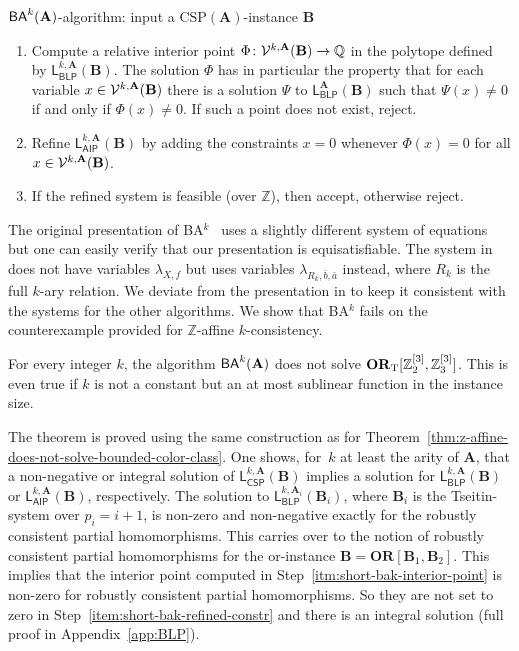 \documentclass[a4paper,english, thm-restate]{lipics-v2021}
\newcommand{\ZZ}{\mathbb{Z}}
\newcommand{\QQ}{\mathbb{Q}}
\newcommand{\tup}[1]{\bar{#1}}
\newcommand{\StructA}{\mathbf{A}}
\newcommand{\StructB}{\mathbf{B}}
\newcommand{\CSP}[1]{\mathrm{CSP}(#1)}
\newcommand{\leqs}{\mathsf{L}}
\newcommand{\cspiso}[3]{\leqs^{#1,#2}_{\mathsf{CSP}}(#3)}
\newcommand{\blk}[3]{\leqs^{#1,#2}_{\mathsf{BLP}} (#3)}
\newcommand{\aipk}[3]{\leqs^{#1,#2}_{\mathsf{AIP}} (#3)}
\newcommand{\blp}[2]{\leqs^#1_{\mathsf{BLP}} (#2)}
\newcommand{\OR}[1]{\mathbf{OR}[#1]}
\begin{document}
	\begin{algobox}{$\BAk{k}{\StructA}$-algorithm: input a $\CSP{\StructA}$-instance $\StructB$}
		\begin{enumerate}
			\item Compute a relative interior point $\Phi \colon \VarsIP{k}{\StructA}{\StructB} \to \QQ $ in the polytope defined by $\blk{k}{\StructA}{\StructB}$.
			The solution $\Phi$ has in particular the property that for each variable $x \in \VarsIP{k}{\StructA}{\StructB}$ there is a solution $\Psi$ to $\blp{\StructA}{\StructB}$ such that $\Psi(x) \neq 0$
			if and only if $\Phi(x) \neq 0$.
			If such a point does not exist, reject.\label{itm:short-bak-interior-point}
			\item \label{item:short-bak-refined-constr} Refine $\aipk{k}{\StructA}{\StructB}$ by adding the constraints
			$x = 0$ whenever $\Phi(x) = 0 $ for all $x\in \VarsIP{k}{\StructA}{\StructB}$.
			\item If the refined system is feasible (over $\ZZ$), then accept, otherwise reject.
		\end{enumerate}	
	\end{algobox}
	\noindent The original presentation of BA$^k$~\cite{CiardoZivny2023Tensors} uses a slightly different system of equations but one can easily verify that our presentation is equisatisfiable. The system in \cite{CiardoZivny2023Tensors} does not have variables $\lambda_{X,f}$ but uses variables $\lambda_{R_k,\tup{b},\tup{a}}$ instead, where $R_k$ is the full $k$-ary relation. We deviate from the presentation in \cite{CiardoZivny2023Tensors} to keep it consistent with the systems for the other algorithms.
	We show that BA$^k$ fails on the counterexample provided for $\ZZ$-affine $k$-consistency.
	
	
	\begin{theorem}[restate=BLPDoesNotSolveBoundedColorClass, name=]
		\label{thm:BLP-does-not-solve-bounded-color-class}
		For every integer $k$, the algorithm $\BAk{k}{\StructA}$ does not solve
		$\ZtwoOrThreeInst$. This is even true if $k$ is not a constant but an at most sublinear function in the instance size.
	\end{theorem}
	\noindent The theorem is proved using the same construction as for Theorem~\ref{thm:z-affine-does-not-solve-bounded-color-class}.
	One shows, for~$k$ at least the arity of $\StructA$, that a non-negative or integral solution of $\cspiso{k}{\StructA}{\StructB}$
	implies a solution for $\blk{k}{\StructA}{\StructB}$
	or $\aipk{k}{\StructA}{\StructB}$, respectively.
	The solution to $\blk{k}{\StructA_i}{\StructB_i}$,
	where $\StructB_i$ is the Tseitin-system over $p_i = i+1$,
	is non-zero and non-negative exactly for the robustly consistent partial homomorphisms.
	This carries over to the notion of  robustly consistent partial homomorphisms
	for the or-instance $\StructB = \OR{\StructB_1,\StructB_2}$.
	This implies that the interior point computed in Step~\ref{itm:short-bak-interior-point} is non-zero for robustly consistent partial homomorphisms.
	So they are not set to zero in Step~\ref{item:short-bak-refined-constr}
	and there is an integral solution (full proof in Appendix~\ref{app:BLP}).
	
\end{document}
